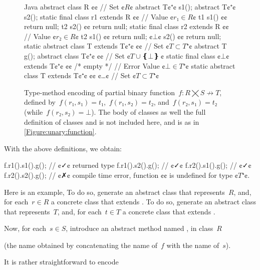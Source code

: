\begin{figure}
  \begin{Code}{Java}
abstract class R {¢¢ // Set ¢$R$¢
  abstract T¢$⁺$¢ s1();
  abstract T¢$⁺$¢ s2();
  static final class r1 extends R {¢¢ // Value ¢$r₁∈R$¢
    t1 s1() {¢¢ return null; }
    t2 s2() {¢¢ return null; }
  }
  static final class r2 extends R {¢¢ // Value ¢$r₂∈R$¢
    t2 s1() {¢¢ return null; }
    ¢$⊥$¢ s2() {¢¢ return null; }
  }
  static abstract class T extends T¢$⁺$¢ {¢¢ // Set ¢$T⊂T⁺$¢
    abstract T g();
  }
  abstract class T¢$⁺$¢ {¢¢ // Set ¢$T∪❴⊥❵~$¢
    static final class ¢$⊥$¢ extends T¢$⁺$¢ {¢¢ /* empty */ } // Error Value ¢$⊥∈T⁺$¢
    static abstract class T extends T¢$⁺$¢ {¢¢ ¢…¢ } // Set ¢$T⊂T⁺$¢
  }
}
\end{Code}
  \caption{Type-method encoding of partial binary function~$f: R⨉S↛T$,
  defined by~$f(r₁,s₁)=t₁$,~$f(r₁,s₂)=t₂$, and~$f(r₂,s₁)=t₂$ (while~$f(r₂, s₂) =⊥$).
  The body of classes  as well the full definition of classes  and  is not included here, and is
    as in \cref{Figure:unary:function}.}
\end{figure}

With the above definitions, we obtain:
  \begin{JAVA}
f.r1().s1().g(); // ¢✓¢ returned type
f.r1().s2().g(); // ¢✓¢
f.r2().s1().g(); // ¢✓¢
f.r2().s2().g(); // ¢✗¢ compile time error, function ¢¢ is undefined for type ¢$T⁺$¢.
\end{JAVA}

Here is an example,
To do so, generate an abstract class  that represents~$R$, and,
  for each~$r∈R$ a concrete class  that extends .
To do so, generate an abstract class  that represents~$T$, and,
  for each~$t∈T$ a concrete class  that extends .

Now, for each~$s∈S$, introduce an abstract method named ,
  in class~$R$

(the name obtained by
  concatenating the name of~$f$ with the name of~$s$).

It is rather straightforward to encode

